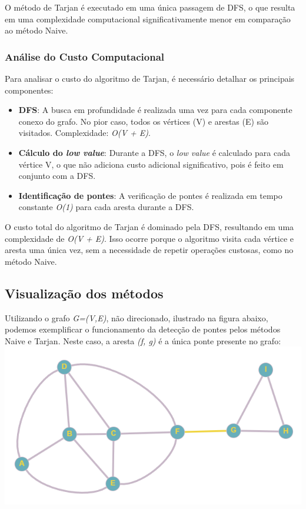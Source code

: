 \documentclass{sbc2023}%
\begin{document}
O método de Tarjan é executado em uma única passagem de DFS, o que resulta em uma complexidade computacional significativamente menor em comparação ao método Naive.

\subsubsection{Análise do Custo Computacional}
Para analisar o custo do algoritmo de Tarjan, é necessário detalhar os principais componentes:
\begin{itemize}
\item \textbf{DFS}: A busca em profundidade é realizada uma vez para cada componente conexo do grafo. No pior caso, todos os vértices (V) e arestas (E) são visitados. Complexidade: \textit{O(V + E)}.
\item \textbf{Cálculo do \textit{low value}}: Durante a DFS, o \textit{low value} é calculado para cada vértice V, o que não adiciona custo adicional significativo, pois é feito em conjunto com a DFS.
\item \textbf{Identificação de pontes}: A verificação de pontes é realizada em tempo constante \textit{O(1)} para cada aresta durante a DFS.
\end{itemize}

O custo total do algoritmo de Tarjan é dominado pela DFS, resultando em uma complexidade de\textit{ O(V + E)}. Isso ocorre porque o algoritmo visita cada vértice e aresta uma única vez, sem a necessidade de repetir operações custosas, como no método Naive.

\subsection{Visualização dos métodos}

Utilizando o grafo \textit{G=(V,E)}, não direcionado, ilustrado na figura abaixo, podemos exemplificar o funcionamento da detecção de pontes pelos métodos Naive e Tarjan. Neste caso, a aresta \textit{(f, g)} é a única ponte presente no grafo: \includegraphics[width=\columnwidth]{grafo.png}
\end{document}
